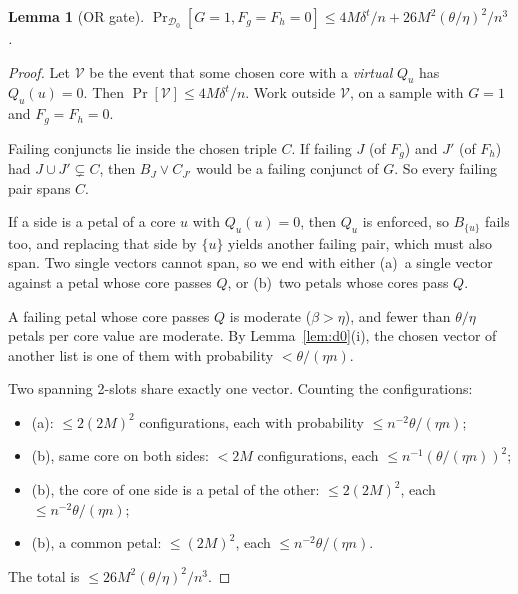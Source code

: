 \documentclass[11pt,a4paper]{article}
\theoremstyle{plain}
\newtheorem{lemma}[theorem]{Lemma}
\theoremstyle{definition}
\theoremstyle{remark}
\newcommand{\Dz}{\mathcal{D}_0}
\begin{document}
\begin{lemma}[OR gate]\label{lem:or}
$\Pr_{\Dz}[G=1,F_g=F_h=0]\le4M\delta^t/n+26M^2(\theta/\eta)^2/n^3$.
\end{lemma}
\begin{proof}
Let $\mathcal V$ be the event that some chosen core with a \emph{virtual} $Q_u$ has $Q_u(u)=0$. Then
$\Pr[\mathcal V]\le4M\delta^t/n$. Work outside $\mathcal V$, on a sample with $G=1$ and $F_g=F_h=0$.

Failing conjuncts lie inside the chosen triple $C$. If failing $J$ (of $F_g$) and $J'$ (of $F_h$) had
$J\cup J'\subsetneq C$, then $B_J\vee C_{J'}$ would be a failing conjunct of $G$. So every failing pair spans $C$.

If a side is a petal of a core $u$ with $Q_u(u)=0$, then $Q_u$ is enforced, so $B_{\{u\}}$ fails too, and replacing
that side by $\{u\}$ yields another failing pair, which must also span. Two single vectors cannot span, so we end
with either (a)~a single vector against a petal whose core passes $Q$, or (b)~two petals whose cores pass $Q$.

A failing petal whose core passes $Q$ is moderate ($\beta>\eta$), and fewer than $\theta/\eta$ petals per core value
are moderate. By Lemma~\ref{lem:d0}(i), the chosen vector of another list is one of them with probability
$<\theta/(\eta n)$.

Two spanning 2-slots share exactly one vector. Counting the configurations:
\begin{itemize}
  \item (a): $\le2(2M)^2$ configurations, each with probability $\le n^{-2}\theta/(\eta n)$;
  \item (b), same core on both sides: $<2M$ configurations, each $\le n^{-1}(\theta/(\eta n))^2$;
  \item (b), the core of one side is a petal of the other: $\le2(2M)^2$, each $\le n^{-2}\theta/(\eta n)$;
  \item (b), a common petal: $\le(2M)^2$, each $\le n^{-2}\theta/(\eta n)$.
\end{itemize}
The total is $\le26M^2(\theta/\eta)^2/n^3$.
\end{proof}
\end{document}
